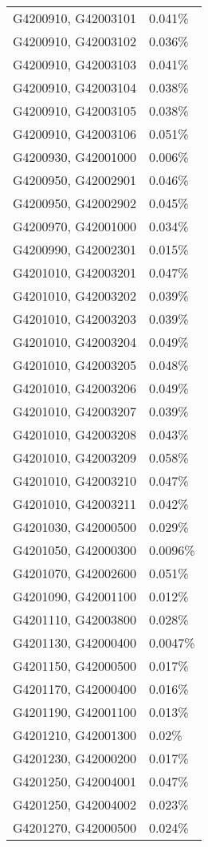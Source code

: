\begin{longtable}[]{@{}ll@{}}
G4200910, G42003101 & 0.041\% \\
G4200910, G42003102 & 0.036\% \\
G4200910, G42003103 & 0.041\% \\
G4200910, G42003104 & 0.038\% \\
G4200910, G42003105 & 0.038\% \\
G4200910, G42003106 & 0.051\% \\
G4200930, G42001000 & 0.006\% \\
G4200950, G42002901 & 0.046\% \\
G4200950, G42002902 & 0.045\% \\
G4200970, G42001000 & 0.034\% \\
G4200990, G42002301 & 0.015\% \\
G4201010, G42003201 & 0.047\% \\
G4201010, G42003202 & 0.039\% \\
G4201010, G42003203 & 0.039\% \\
G4201010, G42003204 & 0.049\% \\
G4201010, G42003205 & 0.048\% \\
G4201010, G42003206 & 0.049\% \\
G4201010, G42003207 & 0.039\% \\
G4201010, G42003208 & 0.043\% \\
G4201010, G42003209 & 0.058\% \\
G4201010, G42003210 & 0.047\% \\
G4201010, G42003211 & 0.042\% \\
G4201030, G42000500 & 0.029\% \\
G4201050, G42000300 & 0.0096\% \\
G4201070, G42002600 & 0.051\% \\
G4201090, G42001100 & 0.012\% \\
G4201110, G42003800 & 0.028\% \\
G4201130, G42000400 & 0.0047\% \\
G4201150, G42000500 & 0.017\% \\
G4201170, G42000400 & 0.016\% \\
G4201190, G42001100 & 0.013\% \\
G4201210, G42001300 & 0.02\% \\
G4201230, G42000200 & 0.017\% \\
G4201250, G42004001 & 0.047\% \\
G4201250, G42004002 & 0.023\% \\
G4201270, G42000500 & 0.024\% \\

\end{longtable}
